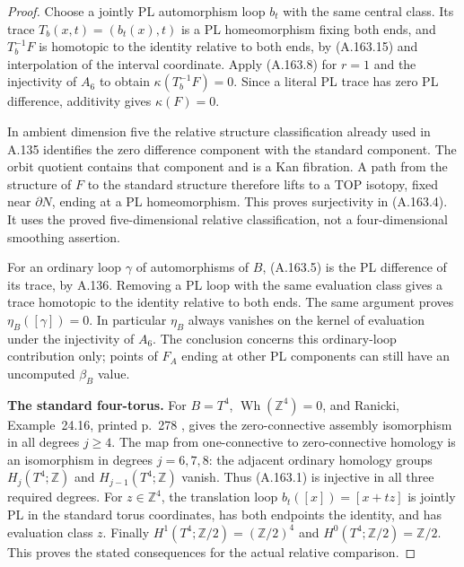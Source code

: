 \begin{proof}
Choose a jointly PL automorphism loop $b_t$ with the same central
class. Its trace $T_b(x,t)=(b_t(x),t)$ is a PL homeomorphism fixing
both ends, and $T_b^{-1}F$ is homotopic to the identity relative to
both ends, by (A.163.15) and interpolation of the interval coordinate.
Apply (A.163.8) for $r=1$ and the injectivity of $A_6$ to obtain
$\kappa(T_b^{-1}F)=0$. Since a literal PL trace has zero PL
difference, additivity gives $\kappa(F)=0$.

In ambient dimension five the relative structure classification
already used in A.135 identifies the zero difference component
with the standard component. The orbit quotient contains that
component and is a Kan fibration. A path from the structure of $F$
to the standard structure therefore lifts to a TOP isotopy, fixed
near $\partial N$, ending at a PL homeomorphism. This proves
surjectivity in (A.163.4). It uses the proved five-dimensional relative
classification, not a four-dimensional smoothing assertion.

For an ordinary loop $\gamma$ of automorphisms of $B$, (A.163.5) is
the PL difference of its trace, by A.136. Removing a PL loop with
the same evaluation class gives a trace homotopic to the identity
relative to both ends. The same argument proves $\eta_B([\gamma])=0$.
In particular $\eta_B$ always vanishes on the kernel of evaluation
under the injectivity of $A_6$. The conclusion concerns this
ordinary-loop contribution only; points of $F_A$ ending at other
PL components can still have an uncomputed $\beta_B$ value.

\textbf{The standard four-torus.}
For $B=T^4$, $\operatorname{Wh}(\mathbb Z^4)=0$, and Ranicki,
Example~24.16, printed p.~278 \cite{Ranicki1992TopologicalManifolds}, gives the zero-connective assembly
isomorphism in all degrees $j\ge4$. The map from one-connective to
zero-connective homology is an isomorphism in degrees $j=6,7,8$:
the adjacent ordinary homology groups $H_j(T^4;\mathbb Z)$ and
$H_{j-1}(T^4;\mathbb Z)$ vanish. Thus (A.163.1) is injective in all
three required degrees. For $z\in\mathbb Z^4$, the translation loop
$b_t([x])=[x+tz]$ is jointly PL in the standard torus coordinates,
has both endpoints the identity, and has evaluation class $z$.
Finally $H^1(T^4;\mathbb Z/2)=(\mathbb Z/2)^4$ and
$H^0(T^4;\mathbb Z/2)=\mathbb Z/2$. This proves the stated
consequences for the actual relative comparison.


\end{proof}
